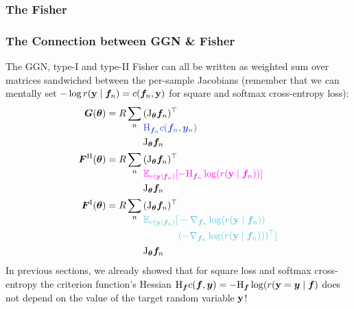 \subsubsection{The Fisher}\label{sec:fisher}


\subsubsection{The Connection between GGN \& Fisher}
The GGN, type-I and type-II Fisher can all be written as weighted sum over matrices sandwiched between the per-sample Jacobians (remember that we can mentally set $-\log r({\mathbf{y}} \mid {\bm{f}}_n) = c({\bm{f}}_n, {\mathbf{y}})$ for square and softmax cross-entropy loss):
\begin{align*}
  \mG(\vtheta)
   & =
  R \sum_n
  \begin{aligned}[t]
     & (\jac_{\vtheta}\vf_n)^\top                           \\
     & \textcolor{VectorBlue}{\hess_{\vf_n}c(\vf_n, \vy_n)} \\
     & \jac_{\vtheta}\vf_n
  \end{aligned}
  \\
  \mF^{\text{II}}(\vtheta)
   & =
  R \sum_n
  \begin{aligned}[t]
     & (\jac_{\vtheta}\vf_n)^\top                                                                 \\
     & \textcolor{VectorPink}{\E_{r(\rvy \mid \vf_n)}[-\hess_{\vf_n} \log( r(\rvy \mid \vf_n)) ]} \\
     & \jac_{\vtheta}\vf_n
  \end{aligned}
  \\
  \mF^{\text{I}}(\vtheta)
   & =
  R \sum_n
  \begin{aligned}[t]
     & (\jac_{\vtheta}\vf_n)^\top                          \\
     & \textcolor{VectorTeal}{\E_{r(\rvy \mid \vf_n)}[
    \begin{aligned}[t]
       & -\nabla_{\vf_n} \log( r(\rvy \mid \vf_n))           \\
       & (-\nabla_{\vf_n} \log( r(\rvy \mid \vf_n)))^{\top}]
    \end{aligned}} \\
     & \jac_{\vtheta}\vf_n
  \end{aligned}
\end{align*}
In previous sections, we already showed that for square loss and softmax cross-entropy the criterion function's Hessian $\mathrm{H}_{\bm{f}} c({\bm{f}}, {\bm{y}}) = -\mathrm{H}_{{\bm{f}}} \log( r({\mathbf{y}} = {\bm{y}} \mid {\bm{f}})$ does not depend on the value of the target random variable ${\mathbf{y}}$!
